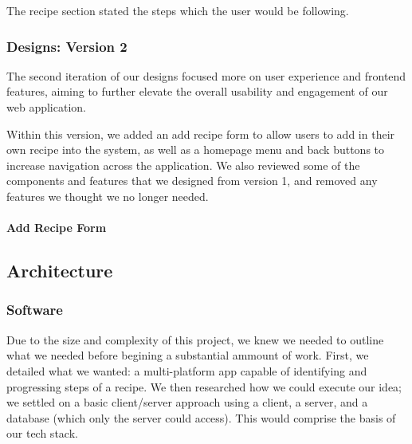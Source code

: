 \documentclass{article}
\begin{document}
The recipe section stated the steps which the user would be following.


\subsubsection{Designs: Version 2}
The second iteration of our designs focused more on user experience and frontend features, aiming to further elevate the overall usability and engagement of our web application.

Within this version, we added an add recipe form to allow users to add in their own recipe into the system, as well as a homepage menu and back buttons to increase navigation across the application. We also reviewed some of the components and features that we designed from version 1, and removed any features we thought we no longer needed.

\paragraph{Add Recipe Form}

\subsection{Architecture}
\subsubsection{Software}
Due to the size and complexity of this project, we knew we needed to outline what we needed before begining a substantial ammount of work. First, we detailed what we wanted: a multi-platform app capable of identifying and progressing steps of a recipe. We then researched how we could execute our idea; we settled on a basic client/server approach using a client, a server, and a database (which only the server could access). This would comprise the basis of our tech stack.
\end{document}
